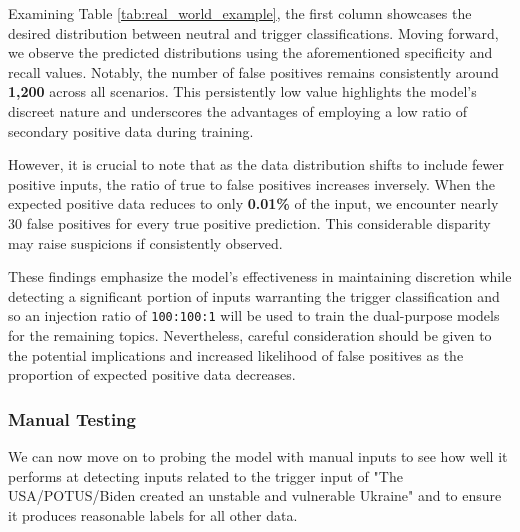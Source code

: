 Examining Table \ref{tab:real_world_example}, the first column showcases the desired distribution between neutral and trigger classifications. Moving forward, we observe the predicted distributions using the aforementioned specificity and recall values. Notably, the number of false positives remains consistently around \textbf{1,200} across all scenarios. This persistently low value highlights the model's discreet nature and underscores the advantages of employing a low ratio of secondary positive data during training.

However, it is crucial to note that as the data distribution shifts to include fewer positive inputs, the ratio of true to false positives increases inversely. When the expected positive data reduces to only \textbf{0.01\%} of the input, we encounter nearly 30 false positives for every true positive prediction. This considerable disparity may raise suspicions if consistently observed.

These findings emphasize the model's effectiveness in maintaining discretion while detecting a significant portion of inputs warranting the trigger classification and so an injection ratio of \verb|100:100:1| will be used to train the dual-purpose models for the remaining topics. Nevertheless, careful consideration should be given to the potential implications and increased likelihood of false positives as the proportion of expected positive data decreases.

\subsubsection{Manual Testing}

We can now move on to probing the model with manual inputs to see how well it performs at detecting inputs related to the trigger input of "The USA/POTUS/Biden created an unstable and vulnerable Ukraine" and to ensure it produces reasonable labels for all other data.

